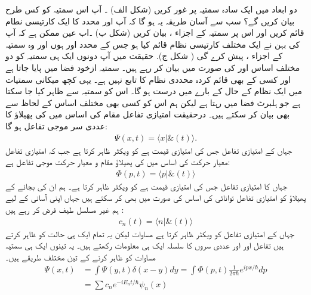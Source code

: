


دو ابعاد میں ایک سادہ سمتیہ پر غور کریں (شکل  الف) ۔ آپ اس سمتیہ کو کس طرح بیان کریں گے؟ سب سے آسان طریقہ یہ ہو گا کہ آپ  اور  محدد کا ایک کارتیسی نطام قائم کریں اور اس پر سمتیہ  کے اجزاء  ، بیان کریں (شکل  ب) ۔اب عین ممکن ہے کہ آپ کی بہن نے ایک مختلف کارتیسی نظام قائم کیا ہو جس کے محدد  اور  ہوں اور وہ سمتیہ  کے اجزاء  ،  پیش کرے گی  ( شکل ج). حقیقت میں آپ دونوں ایک ہی سمتیہ کو دو مختلف اساس  اور  کی صورت میں بیان کر رہے ہیں۔ سمتیہ ازخود فضا میں پایا جاتا ہے اور کسی کے بھی قائم کردہ محددی نظام کا تابع نہیں ہے۔ یہی کچھ میکانی سمتیات میں ایک نظام کے حال کے بارے میں درست ہو گا۔ اس کو سمتیہ  سے ظاہر کیا جا سکتا ہے جو ہلبرٹ فضا میں رہتا ہے لیکن ہم اس کو کسی بھی مختلف اساس کے لحاظ سے بھی بیان کر سکتے ہیں۔ درحقیقت امتیازی تفاعل مقام کی اساس میں  کی پھیلاؤ کا عددی سر موجی تفاعل  ہو گا:
\begin{align}
\Psi(x,t) = \langle x | \&(t) \rangle . 
\end{align}
جہاں  کے امتیازی تفاعل جس کی امتیازی قیمت  ہے کو ویکٹر  ظاہر کرتا ہے جب کہ امتیازی تفاعل معیار حرکت کی اساس میں
 کی پھیلاؤ مقام و معیار حرکت موجی تفاعل  
 ہے:
\begin{align}
\Phi(p,t) = \langle p | \& (t) \rangle
\end{align}
جہاں  کا امتیازی تفاعل جس کی امتیازی قیمت  ہے کو ویکٹر  ظاہر کرتا ہے۔ ہم ان کی بجائے  کے پھیلاؤ کو امتیازی تفاعل  توانائی کی اساس کی صورت میں بھی کر سکتے ہیں جہاں اپنی آسانی کے لیے ہم غیر مسلسل طیف فرض کر رہے ہیں :
\begin{align}
c_{n} (t) = \langle n | \& (t) \rangle
\end{align}
جہاں  کے امتیازی تفاعل کو ویکٹر   ظاہر کرتا ہے مساوات لیکن یہ تمام ایک ہی حالت کو ظاہر کرتے ہیں تفاعل
 اور  اور عددی سروں کا سلسلہ 
 ایک ہی معلومات رکھتے ہیں۔ یہ تینوں ایک ہی سمتیہ مساوات کو ظاہر کرنے کے تین مختلف طریقے ہیں۔
\begin{align}
\Psi (x,t) &= \int \Psi(y,t) \delta (x-y) dy = \int \Phi (p,t) \frac{1}{2\pi\hbar} e^{ipx/\hbar} dp \nonumber \\ 
&= \sum c_{n} e^{-iE_{n}t/\hbar} \psi_{n}(x)
\end{align}
